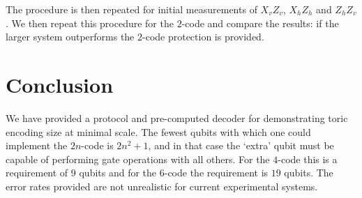 The procedure is then repeated for initial measurements of $X_vZ_v$, $X_hZ_h$ and $Z_hZ_v$. We then repeat this procedure for the $2$-code and compare the results: if the larger system outperforms the $2$-code protection is provided. 


\section{Conclusion}

We have provided a protocol and pre-computed decoder for demonstrating toric encoding size at minimal scale. The fewest qubits with which one could implement the $2n$-code is $2n^2+1$, and in that case the `extra' qubit must be capable of performing gate operations with all others. For the $4$-code this is a requirement of $9$ qubits and for the $6$-code the requirement is $19$ qubits. The error rates provided are not unrealistic for current experimental systems. 


